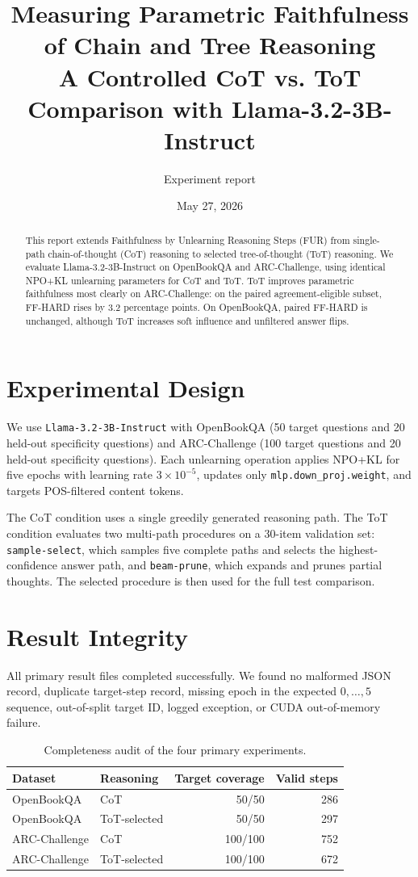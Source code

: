 \documentclass[10pt,a4paper]{article}
\title{\vspace{-1.2cm}\textbf{Measuring Parametric Faithfulness of Chain and Tree Reasoning}\\
\large A Controlled CoT vs. ToT Comparison with Llama-3.2-3B-Instruct}
\author{Experiment report}
\date{May 27, 2026}
\begin{document}
\maketitle

\begin{abstract}
This report extends Faithfulness by Unlearning Reasoning Steps (FUR) from
single-path chain-of-thought (CoT) reasoning to selected tree-of-thought (ToT)
reasoning. We evaluate Llama-3.2-3B-Instruct on OpenBookQA and ARC-Challenge,
using identical NPO+KL unlearning parameters for CoT and ToT. ToT improves
parametric faithfulness most clearly on ARC-Challenge: on the paired
agreement-eligible subset, FF-HARD rises by 3.2 percentage points. On
OpenBookQA, paired FF-HARD is unchanged, although ToT increases soft influence
and unfiltered answer flips.
\end{abstract}

\section{Experimental Design}
We use \texttt{Llama-3.2-3B-Instruct} with OpenBookQA (50 target questions and
20 held-out specificity questions) and ARC-Challenge (100 target questions and
20 held-out specificity questions). Each unlearning operation applies NPO+KL
for five epochs with learning rate \(3\times 10^{-5}\), updates only
\texttt{mlp.down\_proj.weight}, and targets POS-filtered content tokens.

The CoT condition uses a single greedily generated reasoning path. The ToT
condition evaluates two multi-path procedures on a 30-item validation set:
\texttt{sample-select}, which samples five complete paths and selects the
highest-confidence answer path, and \texttt{beam-prune}, which expands and
prunes partial thoughts. The selected procedure is then used for the full test
comparison.

\section{Result Integrity}
All primary result files completed successfully. We found no malformed JSON
record, duplicate target-step record, missing epoch in the expected
\(0,\ldots,5\) sequence, out-of-split target ID, logged exception, or CUDA
out-of-memory failure.

\begin{table}[H]
\centering
\caption{Completeness audit of the four primary experiments.}
\label{tab:integrity}
\begin{tabular}{llrr}
\toprule
Dataset & Reasoning & Target coverage & Valid steps \\
\midrule
OpenBookQA & CoT & 50/50 & 286 \\
OpenBookQA & ToT-selected & 50/50 & 297 \\
ARC-Challenge & CoT & 100/100 & 752 \\
ARC-Challenge & ToT-selected & 100/100 & 672 \\
\bottomrule
\end{tabular}
\end{table}
\end{document}
